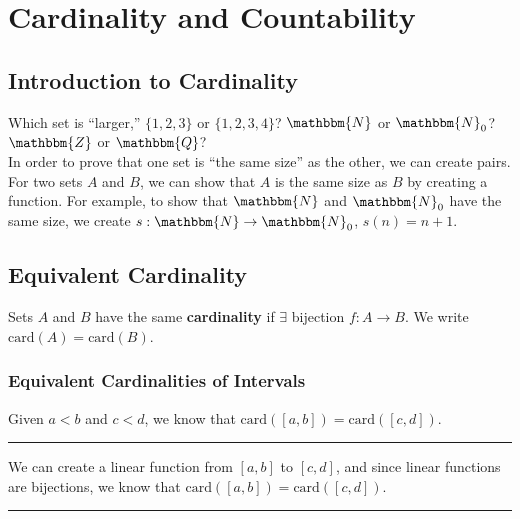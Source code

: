 \documentclass[10pt]{extarticle}
\begin{document}
  \section{Cardinality and Countability}%
  \subsection{Introduction to Cardinality}%
    Which set is ``larger,'' $\{1,2,3\}$ or $\{1,2,3,4\}$? $\mathbbm{N}$ or $\mathbbm{N}_0$? $\mathbbm{Z}$ or $\mathbbm{Q}$?\\

    In order to prove that one set is ``the same size'' as the other, we can create pairs. For two sets $A$ and $B$, we can show that $A$ is the same size as $B$ by creating a function. For example, to show that $\mathbbm{N}$ and $\mathbbm{N}_0$ have the same size, we create $s:\mathbbm{N} \rightarrow \mathbbm{N}_0$, $s(n) = n+1$.
  \subsection{Equivalent Cardinality}%
      Sets $A$ and $B$ have the same \textbf{cardinality} if $\exists$ bijection $f:A\rightarrow B$. We write $\text{card}(A) = \text{card}(B)$.
      \subsubsection{Equivalent Cardinalities of Intervals}%
      Given $a<b$ and $c<d$, we know that $\text{card}\left([a,b]\right) = \text{card}\left([c,d]\right)$.\\
      \vspace{4pt}
      \rule{\textwidth}{0.4pt}
      \vspace{4pt}
      We can create a linear function from $[a,b]$ to $[c,d]$, and since linear functions are bijections, we know that $\text{card}\left([a,b]\right) = \text{card}\left([c,d]\right)$.\\
      \vspace{4pt}
      \rule{\textwidth}{0.4pt}
\end{document}

